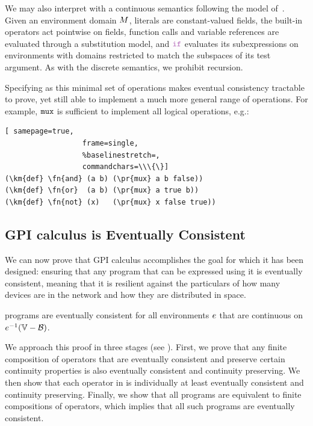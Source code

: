 \documentclass[12pt,a4paper,twoside,openright]{book}
\begin{document}
We may also interpret \calculus{} with a continuous semantics following the model of~\cite{BealUsbeck12}.
%
Given an environment domain $M$, literals are constant-valued fields, the built-in operators act pointwise on fields, function calls and variable references are evaluated through a substitution model, and $\ifN$ evaluates its subexpressions on environments with domains restricted to match the subspaces of its test argument.
%
As with the discrete semantics, we prohibit recursion.

Specifying \calculus{} as this minimal set of operations makes eventual consistency tractable to prove, yet still able to implement a much more general range of operations.
%
For example, $\texttt{mux}$ is sufficient to implement all logical operations, e.g.:
\begin{Verbatim}[ samepage=true,
                  frame=single,
                  %baselinestretch=,
                  commandchars=\\\{\}]
(\km{def} \fn{and} (a b) (\pr{mux} a b false))
(\km{def} \fn{or}  (a b) (\pr{mux} a true b))
(\km{def} \fn{not} (x)   (\pr{mux} x false true))
\end{Verbatim}

\subsection{GPI calculus is Eventually Consistent}

We can now prove that GPI calculus accomplishes the goal for which it has been designed: ensuring that any program that can be expressed using it is eventually consistent, meaning that it is resilient against the particulars of how many devices are in the network and how they are distributed in space.

\begin{thm}
  \calculus{} programs are eventually consistent for all environments
  $e$ that are continuous on $\validdomain{\environment}$.
\end{thm}

We approach this proof in three stages (see ).
%
First, we prove that any finite composition of operators that are eventually consistent and preserve certain continuity properties is also eventually consistent and continuity preserving.
%
We then show that each operator in \calculus{} is individually at least eventually consistent and continuity preserving.  
%
Finally, we show that all \calculus{} programs are equivalent to finite compositions of operators, which implies that all such programs are eventually consistent.
\end{document}
